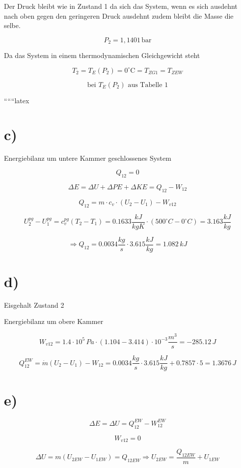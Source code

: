 Der Druck bleibt wie in Zustand 1 da sich das System, wenn es sich ausdehnt nach oben gegen den geringeren Druck ausdehnt zudem bleibt die Masse die selbe.

\[
P_2 = 1,1401 \, \text{bar}
\]

Da das System in einem thermodynamischen Gleichgewicht steht

\[
T_2 = T_E (P_2) = 0^\circ \text{C} = T_{ZG1} = T_{ZEW}
\]

\[
\text{bei } T_E (P_2) \text{ aus Tabelle 1}
\]

``````latex


\section*{c)}

Energiebilanz um untere Kammer geschlossenes System

\[
Q_{12} = 0
\]

\[
\Delta E = \Delta U + \Delta PE + \Delta KE = Q_{12} - W_{12}
\]

\[
Q_{12} = m \cdot c_v \cdot (U_2 - U_1) - W_{v12}
\]

\[
U_2^{pg} - U_1^{pg} = c_v^{pg} (T_2 - T_1) = 0.1633 \frac{kJ}{kgK} \cdot (500^\circ C - 0^\circ C) = 3.163 \frac{kJ}{kg}
\]

\[
\Rightarrow Q_{12} = 0.0034 \frac{kg}{s} \cdot 3.615 \frac{kJ}{kg} = 1.082 \, kJ
\]

\section*{d)}

Eisgehalt Zustand 2

Energiebilanz um obere Kammer

\[
W_{v12} = 1.4 \cdot 10^5 \, Pa \cdot (1.104 - 3.414) \cdot 10^{-3} \frac{m^3}{s} = -285.12 \, J
\]

\[
Q_{12}^{EW} = \dot{m} (U_2 - U_1) - W_{12} = 0.0034 \frac{kg}{s} \cdot 3.615 \frac{kJ}{kg} + 0.7857 \cdot 5 = 1.3676 \, J
\]

\section*{e)}

\[
\Delta E = \Delta U = Q_{12}^{EW} - W_{12}^{EW}
\]

\[
W_{v12} = 0
\]

\[
\Delta U = m (U_{2EW} - U_{1EW}) = Q_{12EW} \Rightarrow U_{2EW} = \frac{Q_{12EW}}{m} + U_{1EW}
\]

